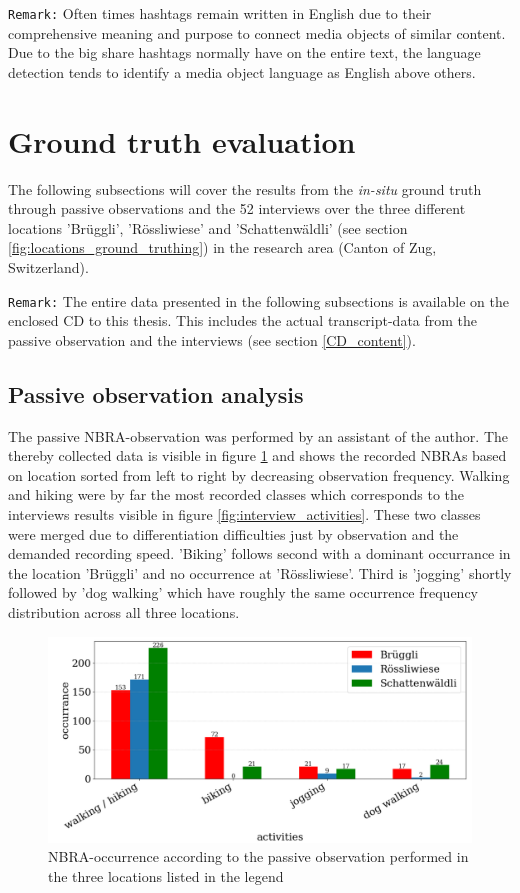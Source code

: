 \texttt{Remark:} Often times hashtags remain written in English due to their comprehensive meaning and purpose to connect media objects of similar content. Due to the big share hashtags normally have on the entire text, the language detection tends to identify a media object language as English above others.

\section{Ground truth evaluation}
The following subsections will cover the results from the \textit{in-situ} ground truth through passive observations and the 52 interviews over the three different locations 'Br\"uggli', 'R\"ossliwiese' and 'Schattenw\"aldli' (see section \ref{fig:locations_ground_truthing}) in the research area (Canton of Zug, Switzerland).

\texttt{Remark:} The entire data presented in the following subsections is available on the enclosed CD to this thesis. This includes the actual transcript-data from the passive observation and the interviews (see section \ref{CD_content}).

\subsection{Passive observation analysis}
The passive NBRA-observation was performed by an assistant of the author. The thereby collected data is visible in figure \ref{fig:passive_observation} and shows the recorded NBRAs based on location sorted from left to right by decreasing observation frequency. Walking and hiking were by far the most recorded classes which corresponds to the interviews results visible in figure \ref{fig:interview_activities}. These two classes were merged due to differentiation difficulties just by observation and the demanded recording speed. 'Biking' follows second with a dominant occurrance in the location 'Br\"uggli' and no occurrence at 'R\"ossliwiese'. Third is 'jogging' shortly followed by 'dog walking' which have roughly the same occurrence frequency distribution across all three locations. 
\begin{figure}[h!]
   \centering
   \includegraphics[width=\textwidth]{img/passive_observations.pdf}
   \caption{NBRA-occurrence according to the passive observation performed in the three locations listed in the legend}
   \label{fig:passive_observation}
\end{figure}

